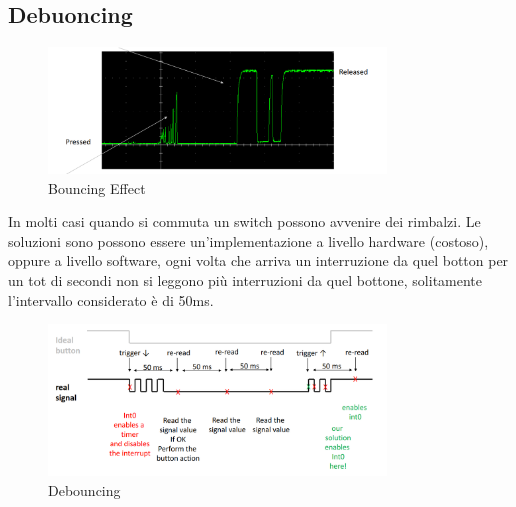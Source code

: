 \documentclass[12pt]{article}
\begin{document}
\subsection{Debuoncing}
\begin{figure}[H]
    \centering
    \includegraphics[width=0.8\textwidth]{bouncing-effect.png}
    \caption{Bouncing Effect}
    \label{fig:bouncing-effect}
\end{figure}
In molti casi quando si commuta un switch possono avvenire dei rimbalzi. Le soluzioni sono possono essere un'implementazione a livello hardware (costoso), oppure a livello software, ogni volta che arriva un interruzione da quel botton per un tot di secondi non si leggono pi\`u interruzioni da quel bottone, solitamente l'intervallo considerato \`e di 50ms.
\begin{figure}[H]
    \centering
    \includegraphics[width=0.8\textwidth]{debouncing.png}
    \caption{Debouncing}
    \label{fig:debouncing}
\end{figure}
\end{document}
